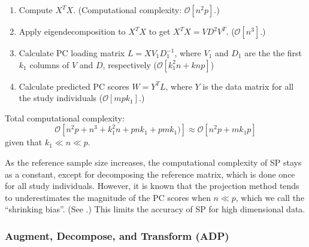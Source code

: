 \documentclass{article}
\newcommand{\bO}{\mathcal{O}}
\begin{document}
\begin{enumerate}
\item Compute $X^T X$.
  (Computational complexity: $\bO[n^2p]$.)  
\item Apply eigendecomposition to $X^T X$ to get $X^T X = V D^2 V^T$.
  ($\bO[n^3]$.)
\item Calculate PC loading matrix $L = X V_1 D_1^{-1}$,
where $V_1$ and $D_1$ are the the first $k_1$ columns of $V$ and $D$, respectively ($\bO[k_1^2 n + knp]$)
\item Calculate predicted PC scores $W = Y^T L$, where $Y$ is the data matrix for all the study individuals ($\bO[mpk_1]$.)
\end{enumerate}

Total computational complexity: 
\[
    \bO[n^2p + n^3 + k_1^2 n + pnk_1 + pmk_1)] \approx \bO[n^2p + mk_1p]
\]
given that $k_1 \ll n \ll p$.

As the reference sample size increases,
the computational complexity of SP stays as a constant,
except for decomposing the reference matrix, which is done once for all study individuals.
However, it is known that the projection method tends to underestimates the magnitude of the PC scores when $n \ll p$,
which we call the ``shrinking bias''. (See \cite{dey}.)
This limits the accuracy of SP for high dimensional data.

\subsubsection{Augment, Decompose, and Transform (ADP)}
\end{document}
